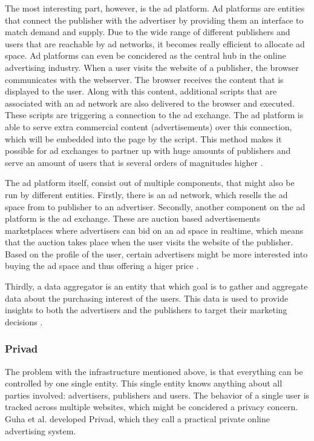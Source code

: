 The most interesting part, however, is the ad platform. Ad platforms are entities that connect the publisher with the advertiser by providing them an interface to match demand and supply. Due to the wide range of different publishers and users that are reachable by ad networks, it becomes really efficient to allocate ad space. Ad platforms can even be concidered as the central hub in the online advertising industry. When a user visits the website of a publisher, the browser communicates with the webserver. The browser receives the content that is displayed to the user. Along with this content, additional scripts that are associated with an ad network are also delivered to the browser and executed. These scripts are triggering a connection to the ad exchange. The ad platform is able to serve extra commercial content (advertisements) over this connection, which will be embedded into the page by the script. This method makes it possible for ad exchanges to partner up with huge amounts of publishers and serve an amount of users that is several orders of magnitudes higher \cite{estrada2017online}.

The ad platform itself, consist out of multiple components, that might also be run by different entities. Firstly, there is an ad network, which resells the ad space from to publisher to an advertiser. Secondly, another component on the ad platform is the ad exchange. These are auction based advertisements marketplaces where advertisers can bid on an ad space in realtime, which means that the auction takes place when the user visits the website of the publisher. Based on the profile of the user, certain advertisers might be more interested into buying the ad space and thus offering a higer price \cite{estrada2017online}. 

Thirdly, a data aggregator is an entity that which goal is to gather and aggregate data about the purchasing interest of the users. This data is used to provide insights to both the advertisers and the publishers to target their marketing decisions \cite{estrada2017online}.

\subsubsection{Privad}
The problem with the infrastructure mentioned above, is that everything can be controlled by one single entity. This single entity knows anything about all parties involved: advertisers, publishers and users. The behavior of a single user is tracked across multiple websites, which might be concidered a privacy concern. Guha et al. \cite{guha2011privad} developed Privad, which they call a practical private online advertising system. 

